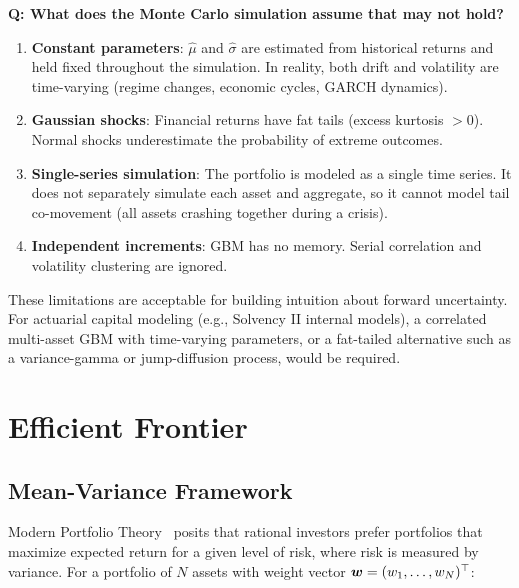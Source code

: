 \begin{interviewbox}
  \textbf{Q: What does the Monte Carlo simulation assume that may not hold?}

  \begin{enumerate}
    \item \textbf{Constant parameters}: $\hat{\mu}$ and $\hat{\sigma}$ are estimated from historical returns and held fixed throughout the simulation. In reality, both drift and volatility are time-varying (regime changes, economic cycles, GARCH dynamics).
    \item \textbf{Gaussian shocks}: Financial returns have fat tails (excess kurtosis $> 0$). Normal shocks underestimate the probability of extreme outcomes.
    \item \textbf{Single-series simulation}: The portfolio is modeled as a single time series. It does not separately simulate each asset and aggregate, so it cannot model tail co-movement (all assets crashing together during a crisis).
    \item \textbf{Independent increments}: GBM has no memory. Serial correlation and volatility clustering are ignored.
  \end{enumerate}

  These limitations are acceptable for building intuition about forward uncertainty. For actuarial capital modeling (e.g., Solvency II internal models), a correlated multi-asset GBM with time-varying parameters, or a fat-tailed alternative such as a variance-gamma or jump-diffusion process, would be required.
\end{interviewbox}

\section{Efficient Frontier}
\label{sec:portfolio-frontier}


\subsection{Mean-Variance Framework}

Modern Portfolio Theory~\cite{markowitz1952} posits that rational investors prefer portfolios that maximize expected return for a given level of risk, where risk is measured by variance. For a portfolio of $N$ assets with weight vector $\boldsymbol{w} = (w_1, \ldots, w_N)^{\top}$:

